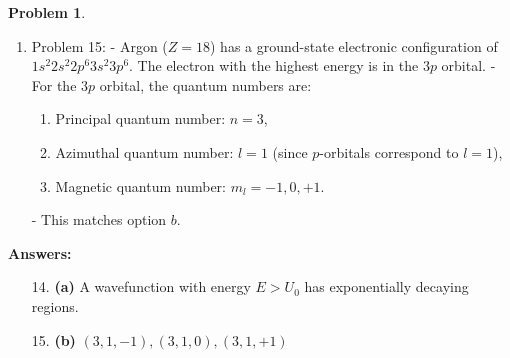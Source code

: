 \documentclass[12pt]{article}
\theoremstyle{definition} %
\newtheorem{problem}{Problem}
\theoremstyle{plain} %
\begin{document}
\begin{problem}
\begin{enumerate}
        \item Problem 15:
        - Argon (\(Z = 18\)) has a ground-state electronic configuration of \(1s^2 2s^2 2p^6 3s^2 3p^6\). The electron with the highest energy is in the \(3p\) orbital.
        - For the \(3p\) orbital, the quantum numbers are:
            \begin{enumerate}
                \item Principal quantum number: \(n = 3\),
                \item Azimuthal quantum number: \(l = 1\) (since \(p\)-orbitals correspond to \(l = 1\)),
                \item Magnetic quantum number: \(m_l = -1, 0, +1\).
            \end{enumerate}
        - This matches option \(b\).
    \end{enumerate}
    
    \textbf{Answers:}
    \begin{enumerate}
        \item[14.] \textbf{(a)} A wavefunction with energy \(E > U_0\) has exponentially decaying regions.
        \item[15.] \textbf{(b)} \((3, 1, -1), (3, 1, 0), (3, 1, +1)\)
    \end{enumerate}
\end{problem}
\end{document}
